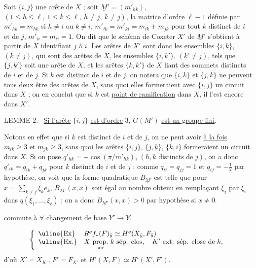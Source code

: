 Soit $\{i,j\}$ une arête de $X$ ; soit $\underline{M}'=(m'_{hk})$, $(1\leq h\leq\ell,\ 1\leq k\leq\ell,\ h\ne j,\ k\ne j)$, la matrice d'ordre $\ell-1$ définie par $m'_{hk}=m_{hk}$ si $h\ne i$ ou $k\ne i$, $m'_{ik}=m'_{ki}=m_{ik}+m_{jk}$ pour tout $k$ distinct de $i$ et de $j$, $m'_{ii}=m_{ii}=1$. On dit que le schéma de Coxeter $X'$ de $\underline M'$ s'obtient à partir de $X$ \uline{identifiant} $j$ \uline{à} $i$. Les arêtes de $X'$ sont donc les ensembles $\{i,k\}$, $(k\ne j)$, qui sont des arêtes de $X$, les ensembles $\{i,k'\}$, $(k'\ne j)$, tels que $\{j,k'\}$ soit une arête de $X$, et les arêtes $\{k,k'\}$ de $X$ liant des sommets distincts de $i$ et de $j$. Si $k$ est distinct de $i$ et de $j$, on notera que $\{i,k\}$ et $\{j,k\}$ ne peuvent tous deux être des arêtes de $X$, sans quoi elles formeraient avec $\{i,j\}$ un circuit dans $X$ ; on en conclut que si $k$ est \uline{point de ramification} dans $X$, il l'est encore dans $X'$.

LEMME 2.-- \uline{Si l'arête} $\{i,j\}$ \uline{est d'ordre} 3, $G(\underline M')$ \uline{est un groupe fini}.

Notons en effet que si $k$ est distinct de $i$ et de $j$, on ne peut avoir \uline{à la fois} $m_{ik}\geq3$ et $m_{jk}\geq3$, sans quoi les arêtes $\{i,j\}$, $\{j,k\}$, $\{k,i\}$ formeraient un circuit dans $X$. Si on pose $q'_{hk}=-\cos(\pi/m'_{hk})$, $(h,k\text{ distincts de }j)$, on a donc $q'_{ik}=q_{ik}+q_{jk}$ pour $k$ distinct de $i$ et de $j$ ; comme $q_{ii}=q_{jj}=1$ et $q_{ij}=-\frac12$ par hypothèse, on voit que la forme quadratique $B_{\underline M'}$ est telle que pour $x=\sum_{k\ne j}\xi_k e_k$, $B_{\underline M'}(x,x)$ soit égal au nombre obtenu en remplaçant $\xi_j$ par $\xi_i$ dans $q(\xi_1,\ldots,\xi_\ell)$ ; on a donc $B_{\underline M'}(x,x)>0$ par hypothèse si $x\ne0$.


commute à $\forall$ changement de base $Y'\longrightarrow Y$.



\[
\left\{\begin{array}{ll}
\uline{\text{Ex}} & R^q f_*(F)_{\bar y}\simeq H^q(X_{\bar y},F_{\bar y})\\
\uline{\text{Ex.}} & X\ \underset{\text{sur}}{\text{prop.}}\ k\text{ sép. clos},\quad K'\text{ ext. sép. close de }k,
\end{array}\right.
\]
d'où $X'=X_{K'}$, $F'=F_{X'}$ et $H^i(X,F)\simeq H^i(X',F')$.

